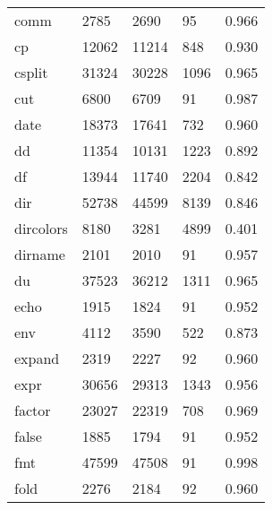 \begin{longtable}{lp{4.5cm}p{4.5cm}p{4.5cm}p{4.5cm}}
comm      &                     2785 &         2690 &            95 &                    0.966 \\
cp        &                    12062 &        11214 &           848 &                    0.930 \\
csplit    &                    31324 &        30228 &          1096 &                    0.965 \\
cut       &                     6800 &         6709 &            91 &                    0.987 \\
date      &                    18373 &        17641 &           732 &                    0.960 \\
dd        &                    11354 &        10131 &          1223 &                    0.892 \\
df        &                    13944 &        11740 &          2204 &                    0.842 \\
dir       &                    52738 &        44599 &          8139 &                    0.846 \\
dircolors &                     8180 &         3281 &          4899 &                    0.401 \\
dirname   &                     2101 &         2010 &            91 &                    0.957 \\
du        &                    37523 &        36212 &          1311 &                    0.965 \\
echo      &                     1915 &         1824 &            91 &                    0.952 \\
env       &                     4112 &         3590 &           522 &                    0.873 \\
expand    &                     2319 &         2227 &            92 &                    0.960 \\
expr      &                    30656 &        29313 &          1343 &                    0.956 \\
factor    &                    23027 &        22319 &           708 &                    0.969 \\
false     &                     1885 &         1794 &            91 &                    0.952 \\
fmt       &                    47599 &        47508 &            91 &                    0.998 \\
fold      &                     2276 &         2184 &            92 &                    0.960 \\

\end{longtable}
